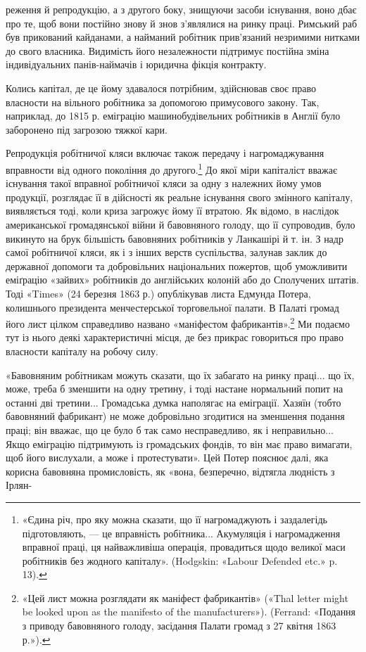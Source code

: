 реження й репродукцію, а з другого боку, знищуючи засоби
існування, воно дбає про те, щоб вони постійно знову й знов
з’являлися на ринку праці. Римський раб був прикований
кайданами, а найманий робітник прив’язаний незримими нитками
до свого власника. Видимість його незалежности підтримує
постійна зміна індивідуальних панів-наймачів і юридична фікція
контракту.

Колись капітал, де це йому здавалося потрібним, здійснював
своє право власности на вільного робітника за допомогою примусового
закону. Так, наприклад, до 1815 р. еміграцію машинобудівельних
робітників в Англії було заборонено під загрозою
тяжкої кари.

Репродукція робітничої кляси включає також передачу і
нагромаджування вправности від одного покоління до другого.\footnote{
«Єдина річ, про яку можна сказати, що її нагромаджують і заздалегідь
підготовляють, — це вправність робітника... Акумуляція і нагромадження
вправної праці, ця найважливіша операція, провадиться щодо
великої маси робітників без жодного капіталу». (Hodgskin: «Labour
Defended etc.» p. 13).
}
До якої міри капіталіст вважає існування такої вправної
робітничої кляси за одну з належних йому умов продукції, розглядає
її в дійсності як реальне існування свого змінного капіталу,
виявляється тоді, коли криза загрожує йому її втратою.
Як відомо, в наслідок американської громадянської війни й
бавовняного голоду, що її супроводив, було викинуто на брук
більшість бавовняних робітників у Ланкашірі й т. ін. З надр
самої робітничої кляси, як і з інших верств суспільства, залунав
заклик до державної допомоги та добровільних національних
пожертов, щоб уможливити еміґрацію «зайвих» робітників до
англійських колоній або до Сполучених штатів. Тоді «Times»
(24 березня 1863 р.) опублікував листа Едмунда Потера, колишнього
президента менчестерської торговельної палати. В Палаті
громад його лист цілком справедливо названо «маніфестом
фабрикантів».\footnote{
«Цей лист можна розглядати як маніфест фабрикантів» («Thal
letter might be looked upon as the manifesto of the manufacturers»).
(Ferrand: «Подання з приводу бавовняного голоду, засідання Палати
громад з 27 квітня 1863 р.»).
} Ми подаємо тут із нього деякі характеристичні
місця, де без прикрас говориться про право власности капіталу
на робочу силу.

«Бавовняним робітникам можуть сказати, що їх забагато на
ринку праці... що їх, може, треба б зменшити на одну третину,
і тоді настане нормальний попит на останні дві третини... Громадська
думка наполягає на еміграції. Хазяїн (тобто бавовняний
фабрикант) не може добровільно згодитися на зменшення подання
праці; він вважає, що це було б так само несправедливо, як
і неправильно... Якщо еміграцію підтримують із громадських
фондів, то він має право вимагати, щоб його вислухали, а може
і протестувати». Цей Потер пояснює далі, яка корисна бавовняна
промисловість, як «вона, безперечно, відтягла людність з Ірлян-